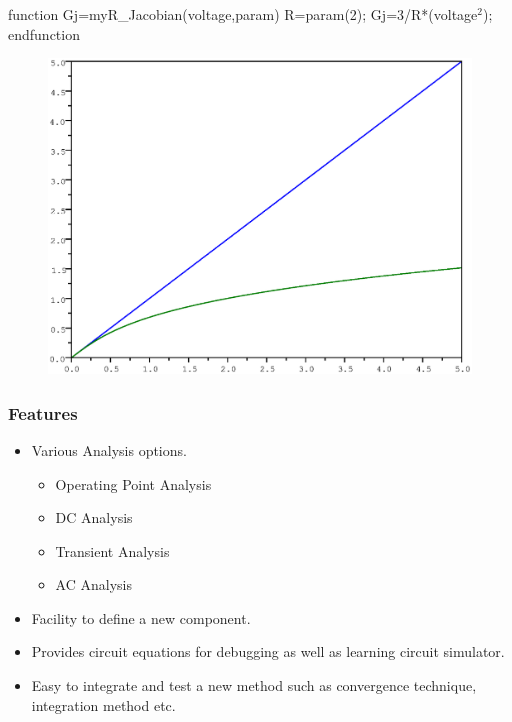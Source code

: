 \documentclass{beamer}
\begin{document}
\begin{frame}
\begin{minipage}[!b]{0.43\linewidth}
\begin{tiny}
function Gj=myR\_Jacobian(voltage,param)\newline 
\hspace*{1cm}R=param(2); \newline
\hspace*{1cm}Gj=3/R*(voltage$^2$);\newline
endfunction
\end{tiny}
\end{minipage}
\hspace{0.5cm} %
\begin{minipage}[!b]{0.5\linewidth} %
\begin{figure}[h]
\centering
\includegraphics[scale=0.3]{../figures/myROutput.eps}
\end{figure}
\end{minipage}
\end{frame}

\begin{frame}
 \frametitle{Features}
\begin{itemize}
  \item Various Analysis options.
    \begin{itemize}
      \item Operating Point Analysis
      \item DC Analysis 
      \item Transient Analysis  
      \item AC Analysis 
    \end{itemize}
  \item Facility to define a new component.
  \item {\color{red} Provides circuit equations for debugging as well as learning circuit simulator.}
  \item Easy to integrate and test a new method such as convergence technique, integration method etc. 
\end{itemize} 
\end{frame}
\end{document}
